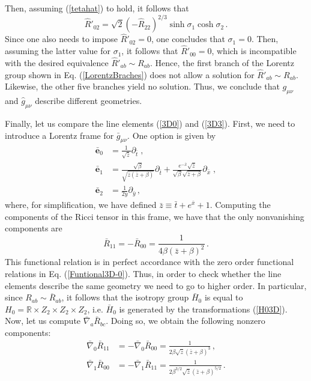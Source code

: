 \documentclass[twocolumn,prd,aps,showpacs,showkeys,amsmath,amssymb]{revtex4-1}
\newcommand{\bl}{\boldsymbol}
\begin{document}
Then, assuming (\ref{tetahat}) to hold, it follows that
\begin{equation*}
  \hat{R}'_{02} = \sqrt{2} (-\hat{R}_{22})^{2/3} \sinh\sigma_1\cosh\sigma_2 \,.
\end{equation*}
Since one also needs to impose $\hat{R}'_{02} = 0$, one concludes that $\sigma_1=0$. Then, assuming the latter value for $\sigma_1$, it follows that $\hat{R}'_{00}=0$, which is incompatible with the desired equivalence $\hat{R}'_{ab} \sim R_{ab}$. Hence, the first branch of the Lorentz group shown in Eq. (\ref{LorentzBraches}) does not allow a solution for  $\hat{R}'_{ab} \sim R_{ab}$. Likewise, the other five branches yield no solution. Thus, we conclude that $g_{\mu\nu}$ and $\hat{g}_{\mu\nu}$ describe different geometries.



Finally, let us compare the line elements  (\ref{3D0}) and (\ref{3D3}).
First, we need to introduce a Lorentz frame for $\bar{g}_{\mu\nu}$. One option is given by
\begin{align*}
  \bar{\bl{e}}_0 &= \frac{1}{\sqrt{\bar{z}} } \partial_{\bar{t}} \;, \\
  \bar{\bl{e}}_1 &=    \frac{\sqrt{\beta}}{\sqrt{\bar{z} (\bar{z} + \beta) } } \partial_{\bar{t}} + \frac{e^{-\bar{x}} \sqrt{\bar{z}} }{ \sqrt{\beta}\sqrt{\bar{z} + \beta}}  \partial_{\bar{x}} \;, \\
  \bar{\bl{e}}_2 &= \frac{1}{ 2\bar{y}} \partial_{\bar{y}} \,,
\end{align*}
where, for simplification, we have defined $\bar{z}\equiv  \bar{t} + e^{\bar{x}} + 1 $. Computing the components of the Ricci tensor in this frame, we have that the only nonvanishing components are
\begin{equation*}
  \bar{R}_{11} = - \bar{R}_{00} = \frac{1}{4\beta (\bar{z} + \beta)^2}\,.
\end{equation*}
This functional relation is in perfect accordance with the zero order functional relations in Eq. (\ref{Funtional3D-0}). Thus, in order to check whether the line elements describe the same geometry we need to go to higher order. In particular, since $R_{ab} \sim \overline{R}_{ab}$,  it follows that the isotropy group $\bar{H}_0$ is equal to $H_0 = \mathbb{R}\times Z_2 \times  Z_2 \times Z_2 $, i.e. $\bar{H}_0$ is generated by the transformations (\ref{H03D}). Now, let us compute $\bar{\nabla}_{a}\bar{R}_{bc}$. Doing so, we obtain the following nonzero components:
\begin{align*}
  \bar{\nabla}_{0}\bar{R}_{11} &=   - \bar{\nabla}_{0}\bar{R}_{00}  = \frac{1}{2\beta\sqrt{\bar{z}} (\bar{z} + \beta)^3} \,,\\
  \bar{\nabla}_{1}\bar{R}_{00} &=   - \bar{\nabla}_{1}\bar{R}_{11}  =
  \frac{1}{2\beta^{3/2}\sqrt{\bar{z}} (\bar{z} + \beta)^{5/2}}\,.
\end{align*}
\end{document}
